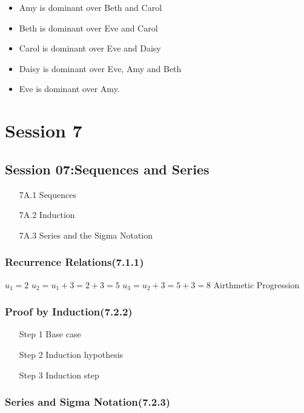 \documentclass[]{report}
\begin{document}
\begin{itemize}
\item Amy is dominant over Beth and Carol
\item Beth is dominant over Eve and Carol
\item Carol is dominant over Eve and Daisy
\item Daisy is dominant over Eve, Amy and Beth
\item Eve is dominant over Amy.
\end{itemize}

\newpage

\chapter{Session 7}


\section*{Session 07:Sequences and Series}
\begin{itemize}
\item[7A.1] Sequences
\item[7A.2] Induction
\item[7A.3] Series and the Sigma Notation
\end{itemize}

\subsection*{Recurrence Relations(7.1.1)}



$u_1 = 2$
$u_2 = u_1 + 3 = 2 +3 = 5$
$u_3 = u_2 + 3 = 5+ 3 = 8$
Airthmetic Progression


\subsection*{Proof by Induction(7.2.2)}
\begin{itemize}
\item[Step 1] Base case
\item[Step 2] Induction hypothesis
\item[Step 3] Induction step
\end{itemize}



\subsection*{Series and Sigma Notation(7.2.3)}
\end{document}
